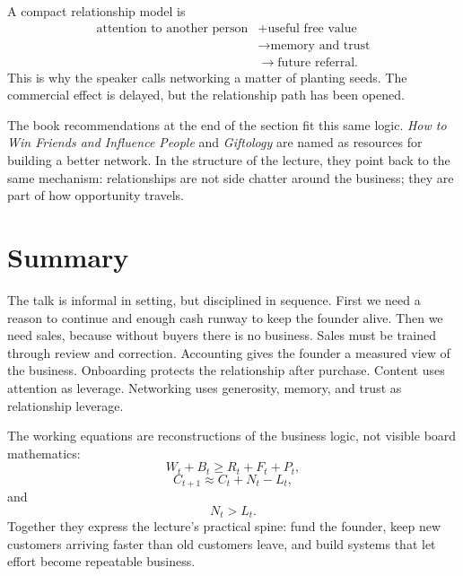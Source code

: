 A compact relationship model is
\[
\begin{aligned}
\text{attention to another person}
&+ \text{useful free value} \\
&\longrightarrow \text{memory and trust} \\
&\longrightarrow \text{future referral}.
\end{aligned}
\]
This is why the speaker calls networking a matter of planting seeds. The commercial effect is delayed, but the relationship path has been opened.

The book recommendations at the end of the section fit this same logic. \emph{How to Win Friends and Influence People} and \emph{Giftology} are named as resources for building a better network. In the structure of the lecture, they point back to the same mechanism: relationships are not side chatter around the business; they are part of how opportunity travels.

\section{Summary}

The talk is informal in setting, but disciplined in sequence. First we need a reason to continue and enough cash runway to keep the founder alive. Then we need sales, because without buyers there is no business. Sales must be trained through review and correction. Accounting gives the founder a measured view of the business. Onboarding protects the relationship after purchase. Content uses attention as leverage. Networking uses generosity, memory, and trust as relationship leverage.

The working equations are reconstructions of the business logic, not visible board mathematics:
\[
W_t+B_t\geq R_t+F_t+P_t,
\]
\[
C_{t+1}\approx C_t+N_t-L_t,
\]
and
\[
N_t>L_t.
\]
Together they express the lecture's practical spine: fund the founder, keep new customers arriving faster than old customers leave, and build systems that let effort become repeatable business.
